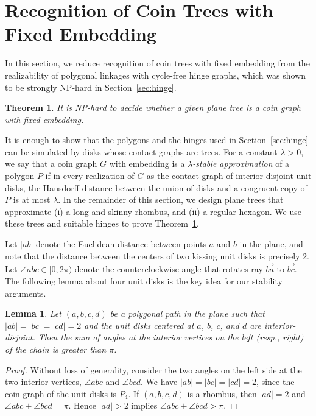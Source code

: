 \documentclass{article}
\theoremstyle{plain}%
\newtheorem{theorem}{Theorem}
\newtheorem{lemma}{Lemma}
\begin{document}
\section{Recognition of Coin Trees with Fixed Embedding\label{sec:disk}}

In this section, we reduce recognition of coin trees with fixed embedding from the realizability of polygonal linkages with cycle-free hinge graphs, which was shown to be strongly NP-hard in Section~\ref{sec:hinge}.

\begin{theorem}\label{thm:disk}
It is NP-hard to decide whether a given plane tree is a coin graph with fixed embedding.
\end{theorem}

It is enough to show that the polygons and the hinges used in Section~\ref{sec:hinge} can be simulated
by disks whose contact graphs are trees.
For a constant $\lambda>0$, we say that a coin graph $G$ with embedding is a \emph{$\lambda$-stable approximation} of a polygon $P$ if in every realization of $G$ as the contact graph of interior-disjoint unit disks, the Hausdorff distance between the union of disks and a congruent copy of $P$ is at most $\lambda$. In the remainder of this section,
 we design plane trees that approximate (i) a long and skinny rhombus, and (ii) a regular hexagon. We use these trees and suitable hinges to prove Theorem~\ref{thm:disk}.

Let $|ab|$ denote the Euclidean distance between points $a$ and $b$ in the plane,
and note that the distance between the centers of two kissing unit disks is precisely 2.
Let $\angle abc\in [0,2\pi)$ denote the counterclockwise angle that rotates
ray $\overrightarrow{ba}$ to $\overrightarrow{bc}$.
The following lemma about four unit disks is the key idea for our stability arguments.

\begin{lemma}\label{lem:P4lemma}
Let $(a,b,c,d)$ be a polygonal path in the plane such that $|ab|=|bc|=|cd|=2$
and the unit disks centered at $a$, $b$, $c$, and $d$ are interior-disjoint.
Then the sum of angles at the interior vertices on the left (resp., right)
of the chain is greater than $\pi$.
\end{lemma}
\begin{proof}
Without loss of generality, consider the two angles on the left
side at the two interior vertices, $\angle abc$ and $\angle bcd$.
We have $|ab|=|bc|=|cd|=2$, since the coin graph of the unit disks is $P_4$.
If $(a,b,c,d)$ is a rhombus, then $|ad|=2$ and $\angle abc+\angle bcd=\pi$.
Hence $|ad|>2$ implies $\angle abc+\angle bcd>\pi$.
\end{proof}
\end{document}
